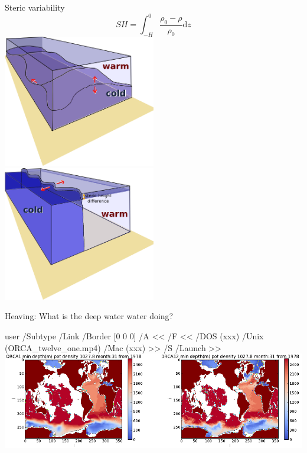 \documentclass{beamer}
\newcommand{\LaunchBinary}[2]{%
  \leavevmode%
  \pdfstartlink user {
    /Subtype /Link
    /Border [0 0 0]%
    /A <<
      /F <<
         /DOS (xxx)
         /Unix (#1)
         /Mac (xxx)
      >>
      /S /Launch
    >>
  }#2%
  \pdfendlink%
}
\begin{document}
\begin{frame}{Steric variability}
\begin{equation*}
 SH = \int^{0}_{-H}  \dfrac{\rho_{0}-\rho}{\rho_{0}}\mathrm{d}z
\end{equation*}
  \includegraphics[width=0.5\textwidth]{drawing-1.png}
  \includegraphics[width=0.5\textwidth]{drawing.png}
\end{frame}

\begin{frame}{Heaving: What is the deep water water doing?}
\begin{center}
\LaunchBinary{ORCA_twelve_one.mp4}{\includegraphics[width=1\textwidth]{rhoDense.png}}%
\end{center}
\end{frame}
\end{document}
